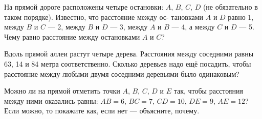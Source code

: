 ﻿
\begin{itemize}
\def\inkm#1{\SI{#1}{\text{км}}}

\itA На прямой дороге расположены четыре остановки: $A$, $B$, $C$, $D$ (не обязательно в таком порядке). Известно, что расстояние между ос- тановками $A$ и $D$ равно \inkm{1}, между $B$ и $C$ — \inkm{2}, между $B$ и $D$ — \inkm{3}, между $A$ и $B$ — \inkm{4}, а между $C$ и $D$ — \inkm{5}. Чему равно расстояние между остановками $A$ и $C$?

\itB Вдоль прямой аллеи растут четыре дерева. Расстояния между соседними равны 63, 14 и 84 метра соответственно. Сколько деревьев надо ещё посадить, чтобы расстояние между любыми двумя соседними деревьями было одинаковым?

\itC Можно ли на прямой отметить точки $A$, $B$, $C$, $D$ и $E$ так, чтобы расстояния между ними оказались равны: $AB=6$, $BC=7$, $CD=10$, $DE=9$, $AE=12$? Если можно, то покажите как, если нет — объясните, почему.
\end{itemize}